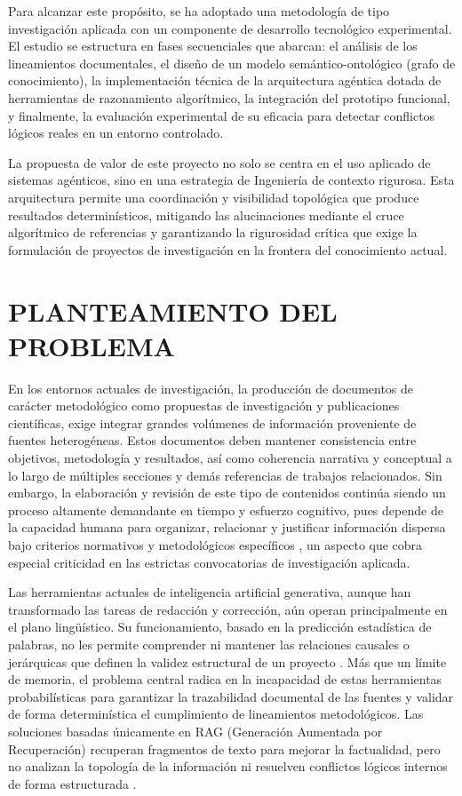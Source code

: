 \documentclass[12pt,letterpaper]{article}
\begin{document}
Para alcanzar este propósito, se ha adoptado una metodología de tipo investigación aplicada con un componente de desarrollo tecnológico experimental. El estudio se estructura en fases secuenciales que abarcan: el análisis de los lineamientos documentales, el diseño de un modelo semántico-ontológico (grafo de conocimiento), la implementación técnica de la arquitectura agéntica dotada de herramientas de razonamiento algorítmico, la integración del prototipo funcional, y finalmente, la evaluación experimental de su eficacia para detectar conflictos lógicos reales en un entorno controlado.

La propuesta de valor de este proyecto no solo se centra en el uso aplicado de sistemas agénticos, sino en una estrategia de Ingeniería de contexto rigurosa. Esta arquitectura permite una coordinación y visibilidad topológica que produce resultados determinísticos, mitigando las alucinaciones mediante el cruce algorítmico de referencias y garantizando la rigurosidad crítica que exige la formulación de proyectos de investigación en la frontera del conocimiento actual.

\newpage
\section{PLANTEAMIENTO DEL PROBLEMA}
\vspace{-0.5cm}

En los entornos actuales de investigación, la producción de documentos de carácter metodológico como propuestas de investigación y publicaciones científicas, exige integrar grandes volúmenes de información proveniente de fuentes heterogéneas. Estos documentos deben mantener consistencia entre objetivos, metodología y resultados, así como coherencia narrativa y conceptual a lo largo de múltiples secciones y demás referencias de trabajos relacionados. Sin embargo, la elaboración y revisión de este tipo de contenidos continúa siendo un proceso altamente demandante en tiempo y esfuerzo cognitivo, pues depende de la capacidad humana para organizar, relacionar y justificar información dispersa bajo criterios normativos y metodológicos específicos \citep{Miles2019}, un aspecto que cobra especial criticidad en las estrictas convocatorias de investigación aplicada.

Las herramientas actuales de inteligencia artificial generativa, aunque han transformado las tareas de redacción y corrección, aún operan principalmente en el plano lingüístico. Su funcionamiento, basado en la predicción estadística de palabras, no les permite comprender ni mantener las relaciones causales o jerárquicas que definen la validez estructural de un proyecto \citep{Zhuang2025}. Más que un límite de memoria, el problema central radica en la incapacidad de estas herramientas probabilísticas para garantizar la trazabilidad documental de las fuentes y validar de forma determinística el cumplimiento de lineamientos metodológicos. Las soluciones basadas únicamente en RAG (Generación Aumentada por Recuperación) recuperan fragmentos de texto para mejorar la factualidad, pero no analizan la topología de la información ni resuelven conflictos lógicos internos de forma estructurada \citep{Singh2025}.
\end{document}
